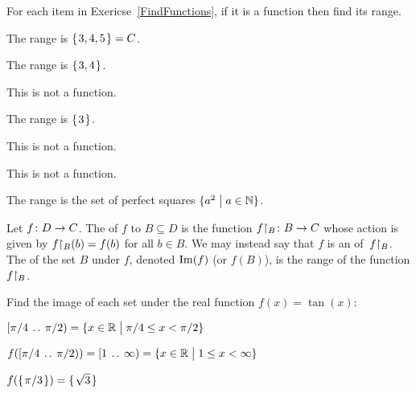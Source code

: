 \documentclass{ibl}  %
\begin{document}
\begin{problem}
For each item in Exericse~\ref{FindFunctions}, 
if it is a function then find its range.  
\begin{answer}
\begin{items}
\item The range is $\mbox{$\{\hspace{0.1em}3,4,5\hspace{0.1em}\}$}=C$.    
\item The range is $\mbox{$\{\hspace{0.1em}3,4\hspace{0.1em}\}$}$.
\item This is not a function.   
\item The range is $\mbox{$\{\hspace{0.1em}3\hspace{0.1em}\}$}$.
\item This is not a function.   
\item This is not a function.   
\item The range is the set of perfect squares $\{a^2 \bigm| a\in\mathbb{N}\}$.   
\end{items}
\end{answer}
\end{problem}

\begin{df}
Let $\mbox{$f\colon D\to C$}$.
The  of $f$ to $B\subseteq D$ is
the function $\mbox{${f}\mathord\upharpoonright_{B}\colon B\to C$}$ whose action is given by 
${f}\mathord\upharpoonright_{B}(b)=f(b)$ for all $b\in B$.
We may instead say that
$f$ is an  of~${f}\mathord\upharpoonright_{B}$.
The  of the set $B$ under $f$, 
denoted $\operatorname{Im}(f)$ (or $f(B)$),
is the range of the function ${f}\mathord\upharpoonright_{B}$.
\end{df}

\begin{problem}
Find the image of each set under the real function $f(x)=\tan(x)$:
\begin{items}
\item $[\pi/4\:\mathinner{\ldotp\ldotp}\:\pi/2)=\{x\in\mathbb{R} \bigm| \pi/4\leq x<\pi/2\}$
\item {}
\end{items}
\begin{answer}
\begin{items}
\item $f([\pi/4\:\mathinner{\ldotp\ldotp}\:\pi/2))=[1\:\mathinner{\ldotp\ldotp}\:\infty)
             =\{x\in\mathbb{R} \bigm| 1\leq x<\infty\}$ 
\item $f(\mbox{$\{\hspace{0.1em}\pi/3\hspace{0.1em}\}$})=\mbox{$\{\hspace{0.1em}\sqrt{3}\hspace{0.1em}\}$}$
\end{items}
\end{answer}
\end{problem}
\end{document}
